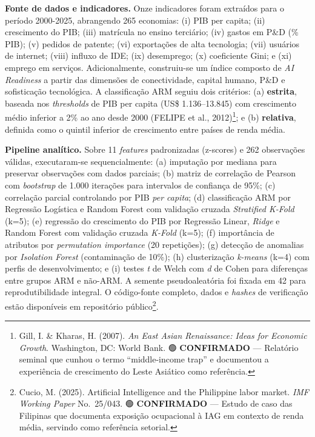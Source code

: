 \documentclass[
  brazilian,
  12pt,
]{article}
\begin{document}
\textbf{Fonte de dados e indicadores.} Onze indicadores foram extraídos para o período 2000-2025, abrangendo 265 economias: (i) PIB per capita; (ii) crescimento do PIB; (iii) matrícula no ensino terciário; (iv) gastos em P\&D (\% PIB); (v) pedidos de patente; (vi) exportações de alta tecnologia; (vii) usuários de internet; (viii) influxo de IDE; (ix) desemprego; (x) coeficiente Gini; e (xi) emprego em serviços. Adicionalmente, construiu-se um índice composto de \emph{AI Readiness} a partir das dimensões de conectividade, capital humano, P\&D e sofisticação tecnológica. A classificação ARM seguiu dois critérios: (a) \textbf{estrita}, baseada nos \emph{thresholds} de PIB per capita (US\$ 1.136--13.845) com crescimento médio inferior a 2\% ao ano desde 2000 (FELIPE et al., 2012)\footnote{Gill, I. \& Kharas, H. (2007). \emph{An East Asian Renaissance: Ideas for Economic Growth}. Washington, DC: World Bank. 🟢 \textbf{CONFIRMADO} --- Relatório seminal que cunhou o termo ``middle-income trap'' e documentou a experiência de crescimento do Leste Asiático como referência.}; e (b) \textbf{relativa}, definida como o quintil inferior de crescimento entre países de renda média.

\textbf{Pipeline analítico.} Sobre 11 \emph{features} padronizadas (z-scores) e 262 observações válidas, executaram-se sequencialmente: (a) imputação por mediana para preservar observações com dados parciais; (b) matriz de correlação de Pearson com \emph{bootstrap} de 1.000 iterações para intervalos de confiança de 95\%; (c) correlação parcial controlando por PIB \emph{per capita}; (d) classificação ARM por Regressão Logística e Random Forest com validação cruzada \emph{Stratified K-Fold} (k=5); (e) regressão do crescimento do PIB por Regressão Linear, \emph{Ridge} e Random Forest com validação cruzada \emph{K-Fold} (k=5); (f) importância de atributos por \emph{permutation importance} (20 repetições); (g) detecção de anomalias por \emph{Isolation Forest} (contaminação de 10\%); (h) clusterização \emph{k-means} (k=4) com perfis de desenvolvimento; e (i) testes \emph{t} de Welch com \emph{d} de Cohen para diferenças entre grupos ARM e não-ARM. A semente pseudoaleatória foi fixada em 42 para reprodutibilidade integral. O código-fonte completo, dados e \emph{hashes} de verificação estão disponíveis em repositório público\footnote{Cucio, M. (2025). Artificial Intelligence and the Philippine labor market. \emph{IMF Working Paper} No.~25/043. 🟢 \textbf{CONFIRMADO} --- Estudo de caso das Filipinas que documenta exposição ocupacional à IAG em contexto de renda média, servindo como referência setorial.}.
\end{document}
